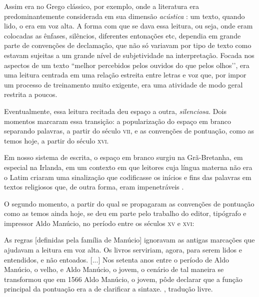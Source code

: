 \documentclass[a4paper,11pt,titlepage,singlespacing]{article}
\renewenvironment{quote}
  {\small\onehalfspacing\list{}{\rightmargin=0cm \leftmargin=4cm}%
   \item\relax}
  {\endlist}
\begin{document}
Assim era no Grego clássico, por exemplo, onde a literatura era predominantemente considerada em sua dimensão \textit{acústica} \cite{kuster2016}: um texto, quando lido, o era em voz alta. A forma com que se dava essa leitura, ou seja, onde eram colocadas as ênfases, silêncios, diferentes entonações etc, dependia em grande parte de convenções de declamação, que não só variavam por tipo de texto como estavam sujeitas a um grande nível de subjetividade na interpretação. Focada nos aspectos de um texto ``melhor percebidos pelos ouvidos do que pelos olhos’’\cite{nunlist1991}, era uma leitura centrada em uma relação estreita entre letras e voz que, por impor um processo de treinamento muito exigente, era uma atividade de modo geral restrita a poucos. 

 
 
   Eventualmente, essa leitura recitada deu espaço a outra, \textit{silenciosa}. Dois momentos marcaram essa transição: a popularização do espaço em branco separando palavras, a partir do século \textsc{vii}, e as convenções de pontuação, como as temos hoje, a partir do século \textsc{xvi}.
   
   Em nosso sistema de escrita, o espaço em branco surgiu na Grã-Bretanha, em especial na Irlanda, em um contexto em que leitores cuja língua materna não era o Latim criaram uma sinalização que codificasse os inícios e fins das palavras em textos religiosos que, de outra forma, eram impenetráveis \cite{kuster2016}.
   
   O segundo momento, a partir do qual se propagaram as convenções de pontuação como as temos ainda hoje, se deu em parte pelo trabalho do editor, tipógrafo e impressor Aldo Manúcio, no período entre os séculos \textsc{xv} e \textsc{xvi}:
   
   
   
   \begin{quote}
   As regras [definidas pela família de Manúcio] ignoravam as antigas marcações que ajudavam a leitura em voz alta. Os livros serviriam, agora, para serem lidos e entendidos, e não entoados. [...] Nos setenta anos entre o período de Aldo Manúcio, o velho, e Aldo Manúcio, o jovem, o cenário de tal maneira se transformou que em 1566 Aldo Manúcio, o jovem, pôde declarar que a função principal da pontuação era a de clarificar a sintaxe. , tradução livre. 
   \end{quote}
   
\end{document}
